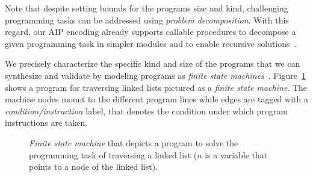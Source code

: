 \documentclass[10pt,a4paper]{paper}
\begin{document}
Note that despite setting bounds for the programs size and kind, challenging programming tasks can be addressed using {\em problem decomposition}. With this regard, our AIP encoding already supports callable procedures to decompose a given programming task in simpler modules and to enable recursive solutions~\cite{sergio:aprograming:icaps16,sergio:aprograming:ijcai16}.

We precisely characterize the specific kind and size of the programs that we can synthesize and validate by modeling programs as {\em finite state machines}~\cite{sergio:aprograming:ijcai16}. Figure~\ref{fig:list} shows a program for traversing linked lists pictured as a {\em finite state machine}. The machine nodes mount to the different program lines while edges are tagged with a {\em condition/instruction} label, that denotes the condition under which program instructions are taken.

\begin{figure}[hbt!]
\begin{center}
\end{center}
\caption{\small {\em Finite state machine} that depicts a program to solve the programming task of traversing a linked list ($n$ is a variable that points to a node of the linked list).}
\label{fig:list}
\end{figure}
\end{document}
